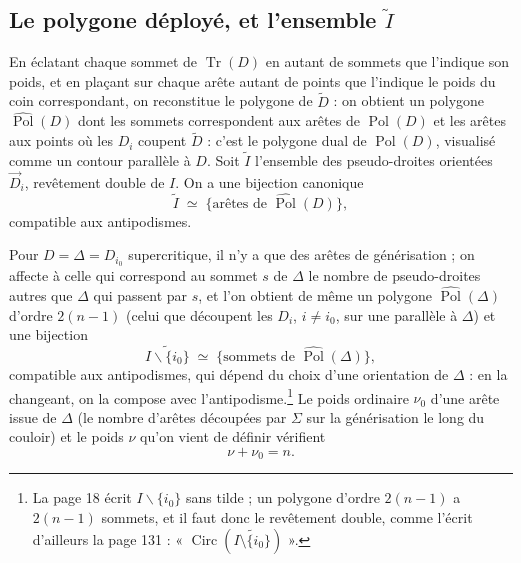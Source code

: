 \documentclass[11pt,a4paper]{article}
\begin{document}
\subsection*{Le polygone déployé, et l'ensemble $\widetilde{I}$}

En éclatant chaque sommet de $\operatorname{Tr}(D)$ en autant de sommets que
l'indique son poids, et en plaçant sur chaque arête autant de points que
l'indique le poids du coin correspondant, on reconstitue le polygone de
$\widetilde{D}$ : on obtient un polygone $\widehat{\operatorname{Pol}}(D)$
dont les sommets correspondent aux arêtes de $\operatorname{Pol}(D)$ et les
arêtes aux points où les $D_i$ coupent $\widetilde{D}$ : c'est le polygone dual de
$\operatorname{Pol}(D)$, visualisé comme un contour parallèle à $D$. Soit
$\widetilde{I}$ l'ensemble des pseudo-droites orientées $\vec{D}_i$, revêtement
double de $I$. On a une bijection canonique
\[
\widetilde{I} \;\simeq\; \lbrace \text{arêtes de }
\widehat{\operatorname{Pol}}(D) \rbrace ,
\]
compatible aux antipodismes.

Pour $D = \Delta = D_{i_0}$ supercritique, il n'y a que des arêtes de
générisation ; on affecte à celle qui correspond au sommet $s$ de $\Delta$ le
nombre de pseudo-droites autres que $\Delta$ qui passent par $s$, et l'on
obtient de même un polygone $\widehat{\operatorname{Pol}}(\Delta)$ d'ordre
$2(n-1)$ (celui que découpent les $D_i$, $i \neq i_0$, sur une parallèle à
$\Delta$) et une bijection
\[
\widetilde{I \smallsetminus \lbrace i_0 \rbrace} \;\simeq\; \lbrace
\text{sommets de } \widehat{\operatorname{Pol}}(\Delta) \rbrace ,
\]
compatible aux antipodismes, qui dépend du choix d'une orientation de
$\Delta$ : en la changeant, on la compose avec l'antipodisme.\footnote{La page
18 écrit $I \smallsetminus \lbrace i_0 \rbrace$ sans tilde ; un polygone d'ordre
$2(n-1)$ a $2(n-1)$ sommets, et il faut donc le revêtement double, comme
l'écrit d'ailleurs la page 131 : « $\operatorname{Circ}(\widetilde{I \setminus
\lbrace i_0 \rbrace})$ ».} Le poids ordinaire $\nu_0$ d'une arête issue de
$\Delta$ (le nombre d'arêtes découpées par $\Sigma$ sur la générisation le long
du couloir) et le poids $\nu$ qu'on vient de définir vérifient
\[
\nu + \nu_0 = n .
\]
\end{document}

